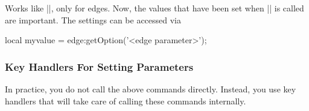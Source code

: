\begin{command}{\pgfgdedgeparameter{}} 
  Works like |\pgfgdnodeparameter|, only for edges. Now, the values
  that have been set when |\pgfgdedge| is called are important. The
  settings can be accessed via 
\begin{codeexample}
  local myvalue = edge:getOption('<edge parameter>');
\end{codeexample}
\end{command}


\subsubsection{Key Handlers  For Setting Parameters}

In practice, you do not call the above commands directly. Instead, you
use key handlers that will take care of calling these commands
internally.

